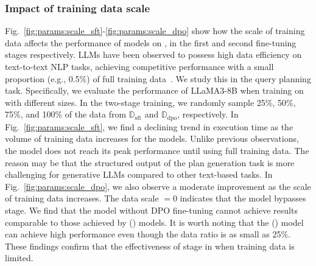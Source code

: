 \subsubsection{Impact of training data scale} 
Fig.~\ref{fig:params:scale_sft}-\ref{fig:params:scale_dpo} show how the scale of training data affects the performance of \LLMQO models on \dsb, in the first and second fine-tuning stages respectively.
LLMs have been observed to possess high data efficiency on text-to-text NLP tasks, achieving competitive performance with a small proportion (e.g., 0.5\%) of full training data~\cite{DBLP:journals/corr/abs-2305-09246}. We study this in the query planning task. 
Specifically, we evaluate the performance of LLaMA3-8B when training on \dsb with different sizes. In the two-stage training, we randomly sample 25\%, 50\%, 75\%, and 100\% of the data from $\mathbb{D}_\mathrm{sft}$ and $\mathbb{D}_\mathrm{dpo}$, respectively. 
In Fig.~\ref{fig:params:scale_sft}, we find a declining trend in execution time as the volume of training data increases for the \QIT models.
Unlike previous observations\cite{DBLP:journals/corr/abs-2305-09246}, the model does not reach its peak performance until using full training data. The reason may be that the structured output of the plan generation task is more challenging for generative LLMs compared to other text-based tasks.
In Fig.~\ref{fig:params:scale_dpo}, we also observe a moderate improvement as the scale of training data increases. 
The data scale $=0$ indicates that the model bypasses \QDPO stage.
We find that the model without DPO fine-tuning cannot achieve results comparable to those achieved by
\LLMQO (\QDPO) models. It is worth noting that the \LLMQO (\QDPO) model can achieve high performance even though the data ratio is as small as 25\%. These findings confirm that the effectiveness of \QDPO stage in \LLMQO when training data is limited.



